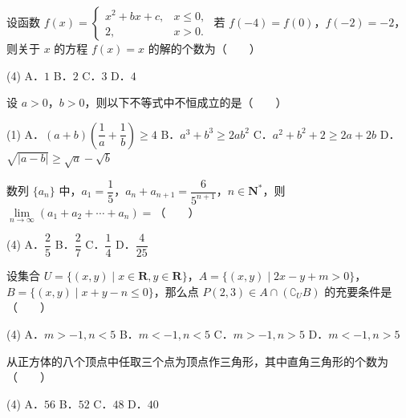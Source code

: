 \begin{question}
设函数 $f(x) = \begin{cases} x^2 + bx + c, & x \leqslant 0, \\ 2, & x > 0. \end{cases}$ 若 $f(-4) = f(0)$，$f(-2) = -2$，则关于 $x$ 的方程 $f(x) = x$ 的解的个数为\mbox{（　　）}

\begin{gkopts}(4)
\task A．$1$
\task B．$2$
\task C．$3$
\task D．$4$
\end{gkopts}

\end{question}
\begin{question}
设 $a > 0$，$b > 0$，则以下不等式中不恒成立的是\mbox{（　　）}

\begin{gkopts}(1)
\task A．$(a + b)\left(\dfrac{1}{a} + \dfrac{1}{b}\right) \geqslant 4$
\task B．$a^3 + b^3 \geqslant 2ab^2$
\task C．$a^2 + b^2 + 2 \geqslant 2a + 2b$
\task D．$\sqrt{|a - b|} \geqslant \sqrt{a} - \sqrt{b}$
\end{gkopts}

\end{question}
\begin{question}
数列 $\{a_n\}$ 中，$a_1 = \dfrac{1}{5}$，$a_n + a_{n+1} = \dfrac{6}{5^{n+1}}$，$n \in \mathbf{N}^*$，则 $\lim\limits_{n \to \infty} (a_1 + a_2 + \cdots + a_n) =$\mbox{（　　）}

\begin{gkopts}(4)
\task A．$\dfrac{2}{5}$
\task B．$\dfrac{2}{7}$
\task C．$\dfrac{1}{4}$
\task D．$\dfrac{4}{25}$
\end{gkopts}

\end{question}
\begin{question}
设集合 $U = \{(x, y) \mid x \in \mathbf{R}, y \in \mathbf{R}\}$，$A = \{(x, y) \mid 2x - y + m > 0\}$，$B = \{(x, y) \mid x + y - n \leqslant 0\}$，那么点 $P(2, 3) \in A \cap (\complement_U B)$ 的充要条件是\mbox{（　　）}

\begin{gkopts}(4)
\task A．$m > -1, n < 5$
\task B．$m < -1, n < 5$
\task C．$m > -1, n > 5$
\task D．$m < -1, n > 5$
\end{gkopts}

\end{question}
\begin{question}
从正方体的八个顶点中任取三个点为顶点作三角形，其中直角三角形的个数为\mbox{（　　）}

\begin{gkopts}(4)
\task A．$56$
\task B．$52$
\task C．$48$
\task D．$40$
\end{gkopts}

\end{question}
